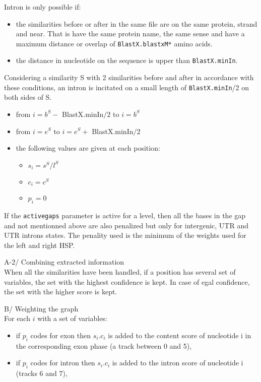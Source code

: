 Intron is only possible if:
\begin{itemize}
\item the similarities before or after in the same file are on the
  same protein, strand and near. That is have the same protein name,
  the same sense and have a maximum distance or overlap of
  \texttt{BlastX.blastxM*} amino acids.
\item the distance in nucleotide on the sequence is upper than
  \texttt{BlastX.minIn}.
\end{itemize}
Considering a similarity S with 2 similarities before and after in
accordance with these conditions, an intron is incitated on a small
length of \texttt{BlastX.minIn}/2 on both sides of S. 
\begin{itemize}
\item from $i = b^S -$ BlastX.minIn$/2$ to $i = b^S$ 
\item from $i = e^S$ to $i = e^S +$ BlastX.minIn$/2$ 
\item the following values are given at each position:
  \begin{itemize}
  \item $s_i = s^S / l^S$ 
  \item $c_i = c^S$ 
  \item $p_i = 0$
  \end{itemize}
\end{itemize}

If the \texttt{activegaps} parameter is active for a level, then all the bases
in the gap and not mentionned above are also penalized but only for
intergenic, UTR and UTR introns states. The penality used is the minimum
of the weights used for the left and right HSP.

A-2/ Combining extracted information\\

When all the similarities have been handled, if a position has several
set of variables, the set with the highest confidence is kept. In
case of egal confidence, the set with the higher score is kept.

B/ Weighting the graph\\

For each $i$ with a set of variables:
\begin{itemize}
\item if $p_i$ codes for exon then $s_i .c_i$ is added to the content
  score of nucleotide i in the corresponding exon phase (a track
  between 0 and 5),
\item if $p_i$ codes for intron then $s_i .c_i$ is added to the intron
  score of nucleotide i (tracks 6 and 7),
\end{itemize}

